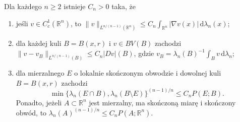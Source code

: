 \begin{lemat}
\label{lem:dg-relative-isoperimetric}
Dla każdego $n\ge2$ istnieje $C_n>0$ taka, że
\begin{enumerate}[label=(\roman*)]
\item jeśli $v\in C_c^1(\mathbb R^n)$, to
 $\|v\|_{L^{n/(n-1)}(\mathbb R^n)}\le
 C_n\int_{\mathbb R^n}|\nabla v(x)|\,\mathrm d\lambda_n(x)$;
\item dla każdej kuli $B=B(x,r)$ i $v\in BV(B)$ zachodzi
 $\|v-v_B\|_{L^{n/(n-1)}(B)}\le C_n|Dv|(B)$,
 gdzie $v_B=\lambda_n(B)^{-1}\int_Bv\,\mathrm d\lambda_n$;
\item dla mierzalnego $E$ o lokalnie skończonym obwodzie
 i dowolnej kuli $B=B(x,r)$ zachodzi
 \[
 \min\{\lambda_n(E\cap B),\lambda_n(B\setminus E)\}^{(n-1)/n}
 \le C_n P(E;B).
 \]
 Ponadto, jeżeli $A\subset\mathbb R^n$ jest mierzalny,
 ma skończoną miarę i skończony obwód, to
 $\lambda_n(A)^{(n-1)/n}\le C_nP(A;\mathbb R^n)$.
\end{enumerate}
\end{lemat}
